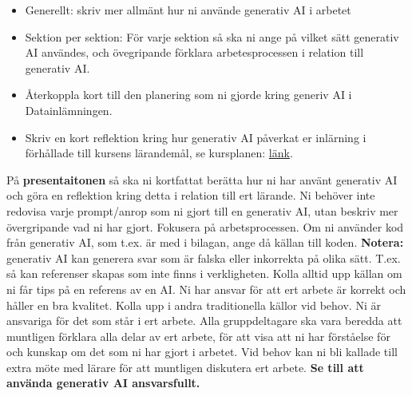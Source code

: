 \documentclass[a4paper]{article}
\begin{document}
\begin{itemize}
    \item Generellt: skriv mer allmänt hur ni använde generativ AI i arbetet
    \item Sektion per sektion: För varje sektion så ska ni ange på vilket sätt generativ AI användes, och övegripande förklara arbetesprocessen i relation till generativ AI.
    \item Återkoppla kort till den planering som ni gjorde kring generiv AI i Datainlämningen.
    \item Skriv en kort reflektion kring hur generativ AI påverkat er inlärning i 
    förhållade till kursens lärandemål, se kursplanen: \href{https://studieinfo.liu.se/kurs/732g57#syllabus}{länk}.
\end{itemize}

På \textbf{presentaitonen} så ska ni kortfattat berätta hur ni har använt generativ AI och göra en reflektion kring detta i relation till ert lärande.
\newline
\newline
Ni behöver inte redovisa varje prompt/anrop som ni gjort till en generativ AI, 
utan beskriv mer övergripande vad ni har gjort. Fokusera på arbetsprocessen. Om ni använder kod från generativ AI,
som t.ex. är med i bilagan, ange då källan till koden.
\newline
\newline
\textbf{Notera:}  generativ AI kan generera svar som är falska eller inkorrekta på olika sätt. 
T.ex. så kan referenser skapas som inte finns i verkligheten. Kolla alltid upp 
källan om ni får tips på en referens av en AI. Ni har ansvar för att ert arbete
är korrekt och håller en bra kvalitet. Kolla upp i andra traditionella källor vid behov. Ni är ansvariga för det som står i ert arbete. 
\newline
\newline
Alla gruppdeltagare ska vara beredda att muntligen förklara alla delar av ert arbete, för att visa att ni har förståelse för och kunskap om det som ni har gjort i arbetet. 
Vid behov kan ni bli kallade till extra möte med lärare för att muntligen diskutera ert arbete.
\newline
\newline
\textbf{Se till att använda generativ AI ansvarsfullt.}
\end{document}
